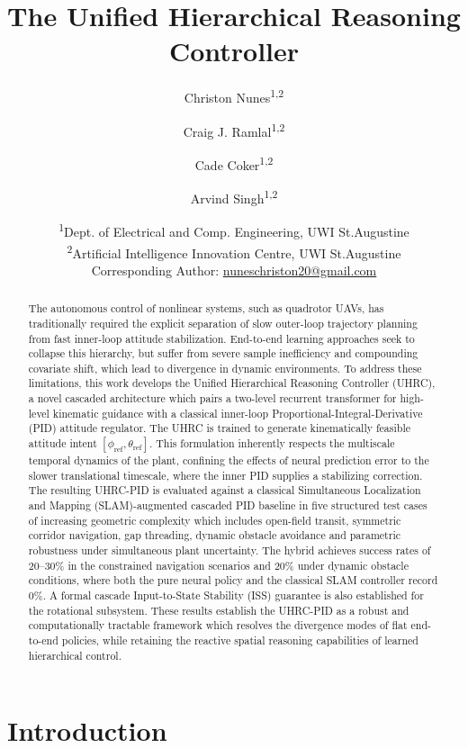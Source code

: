 \documentclass[12pt, a4paper]{article}
\title{The Unified Hierarchical Reasoning Controller}
\author{
    Christon Nunes\textsuperscript{1,2} \and
    Craig J. Ramlal\textsuperscript{1,2} \and
    Cade Coker\textsuperscript{1,2} \and
    Arvind Singh\textsuperscript{1,2}
}
\date{
    \textsuperscript{1}Dept. of Electrical and Comp. Engineering, UWI St.Augustine \\
    \textsuperscript{2}Artificial Intelligence Innovation Centre, UWI St.Augustine \\
    \small Corresponding Author: \href{mailto:nuneschriston20@gmail.com}{nuneschriston20@gmail.com}
}
\begin{document}
\maketitle
\begin{abstract}
The autonomous control of nonlinear systems, such as quadrotor UAVs, has traditionally required the explicit separation of slow outer-loop trajectory planning from fast inner-loop attitude stabilization.
End-to-end learning approaches seek to collapse this hierarchy, but suffer from severe sample inefficiency and compounding covariate shift, which lead to divergence in dynamic environments.
To address these limitations, this work develops the Unified Hierarchical Reasoning Controller (UHRC), a novel cascaded architecture which pairs a two-level recurrent transformer for high-level kinematic guidance with a classical inner-loop Proportional-Integral-Derivative (PID) attitude regulator.
The UHRC is trained to generate kinematically feasible attitude intent $[\phi_{\mathrm{ref}}, \theta_{\mathrm{ref}}]$.
This formulation inherently respects the multiscale temporal dynamics of the plant, confining the effects of neural prediction error to the slower translational timescale, where the inner PID supplies a stabilizing correction.
The resulting UHRC-PID is evaluated against a classical Simultaneous Localization and Mapping (SLAM)-augmented cascaded PID baseline in five structured test cases of increasing geometric complexity which includes open-field transit, symmetric corridor navigation, gap threading, dynamic obstacle avoidance and parametric robustness under simultaneous plant uncertainty.
The hybrid achieves success rates of 20--30\% in the constrained navigation scenarios and 20\% under dynamic obstacle conditions, where both the pure neural policy and the classical SLAM controller record 0\%.
A formal cascade Input-to-State Stability (ISS) guarantee is also established for the rotational subsystem.
These results establish the UHRC-PID as a robust and computationally tractable framework which resolves the divergence modes of flat end-to-end policies, while retaining the reactive spatial reasoning capabilities of learned hierarchical control.
\end{abstract}

\section{Introduction}
\label{sec:introduction}
\end{document}
